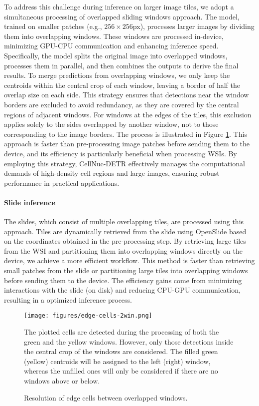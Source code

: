 To address this challenge during inference on larger image tiles, we adopt a simultaneous processing of overlapped sliding windows approach. The model, trained on smaller patches (e.g., $256 \times 256$px), processes larger images by dividing them into overlapping windows. These windows are processed in-device, minimizing GPU-CPU communication and enhancing inference speed. Specifically, the model splits the original image into overlapped windows, processes them in parallel, and then combines the outputs to derive the final results. To merge predictions from overlapping windows, we only keep the centroids within the central crop of each window, leaving a border of half the overlap size on each side. This strategy ensures that detections near the window borders are excluded to avoid redundancy, as they are covered by the central regions of adjacent windows. For windows at the edges of the tiles, this exclusion applies solely to the sides overlapped by another window, not to those corresponding to the image borders. The process is illustrated in Figure \ref{fig:edge-cells}. This approach is faster than pre-processing image patches before sending them to the device, and its efficiency is particularly beneficial when processing WSIs. By employing this strategy, CellNuc-DETR effectively manages the computational demands of high-density cell regions and large images, ensuring robust performance in practical applications.

\paragraph{Slide inference} The slides, which consist of multiple overlapping tiles, are processed using this approach. Tiles are dynamically retrieved from the slide using OpenSlide \cite{goode2013openslide} based on the coordinates obtained in the pre-processing step. By retrieving large tiles from the WSI and partitioning them into overlapping windows directly on the device, we achieve a more efficient workflow. This method is faster than retrieving small patches from the slide or partitioning large tiles into overlapping windows before sending them to the device. The efficiency gains come from minimizing interactions with the slide (on disk) and reducing CPU-GPU communication, resulting in a optimized inference process.

\begin{figure}
    \centering
    \texttt{[image: figures/edge-cells-2win.png]}
    \caption{Resolution of edge cells between overlapped windows.}
    \footnotesize{
        The plotted cells are detected during the processing of both the green and the yellow windows. However, only those detections inside the central crop of the windows are considered. The filled green (yellow) centroids will be assigned to the left (right) window, whereas the unfilled ones will only be considered if there are no windows above or below.
    }
    \label{fig:edge-cells}
\end{figure}

